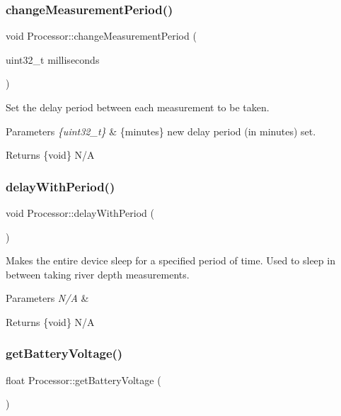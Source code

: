 \subsubsection{\texorpdfstring{change\+Measurement\+Period()}{changeMeasurementPeriod()}}
{\footnotesize\ttfamily void Processor\+::change\+Measurement\+Period (\begin{DoxyParamCaption}\item[{uint32\+\_\+t}]{milliseconds }\end{DoxyParamCaption})}

Set the delay period between each measurement to be taken. 
\begin{DoxyParams}{Parameters}
{\em \{uint32\+\_\+t\}} & \{minutes\} new delay period (in minutes) set. \\
\hline
\end{DoxyParams}
\begin{DoxyReturn}{Returns}
\{void\} N/A 
\end{DoxyReturn}
\mbox{\label{class_processor_a6ad79126a7694ed86f3f5ccc36b606bd}} 
\subsubsection{\texorpdfstring{delay\+With\+Period()}{delayWithPeriod()}}
{\footnotesize\ttfamily void Processor\+::delay\+With\+Period (\begin{DoxyParamCaption}{ }\end{DoxyParamCaption})}

Makes the entire device sleep for a specified period of time. Used to sleep in between taking river depth measurements. 
\begin{DoxyParams}{Parameters}
{\em N/A} & \\
\hline
\end{DoxyParams}
\begin{DoxyReturn}{Returns}
\{void\} N/A 
\end{DoxyReturn}
\mbox{\label{class_processor_aa467c82cb9a57d597487fc319c878c36}} 
\subsubsection{\texorpdfstring{get\+Battery\+Voltage()}{getBatteryVoltage()}}
{\footnotesize\ttfamily float Processor\+::get\+Battery\+Voltage (\begin{DoxyParamCaption}{ }\end{DoxyParamCaption})}

